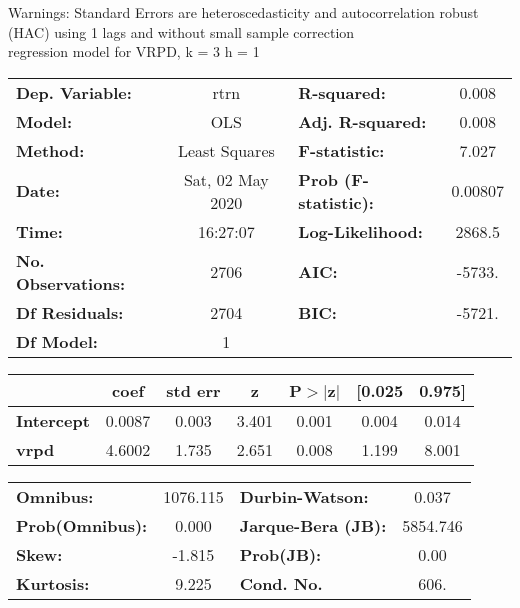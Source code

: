 Warnings: \newline
 [1] Standard Errors are heteroscedasticity and autocorrelation robust (HAC) using 1 lags and without small sample correction\\ 

regression model for VRPD, k = 3 h = 1\begin{center}
\begin{tabular}{lclc}
\toprule
\textbf{Dep. Variable:}    &       rtrn       & \textbf{  R-squared:         } &     0.008   \\
\textbf{Model:}            &       OLS        & \textbf{  Adj. R-squared:    } &     0.008   \\
\textbf{Method:}           &  Least Squares   & \textbf{  F-statistic:       } &     7.027   \\
\textbf{Date:}             & Sat, 02 May 2020 & \textbf{  Prob (F-statistic):} &  0.00807    \\
\textbf{Time:}             &     16:27:07     & \textbf{  Log-Likelihood:    } &    2868.5   \\
\textbf{No. Observations:} &        2706      & \textbf{  AIC:               } &    -5733.   \\
\textbf{Df Residuals:}     &        2704      & \textbf{  BIC:               } &    -5721.   \\
\textbf{Df Model:}         &           1      & \textbf{                     } &             \\
\bottomrule
\end{tabular}
\begin{tabular}{lcccccc}
                   & \textbf{coef} & \textbf{std err} & \textbf{z} & \textbf{P$> |$z$|$} & \textbf{[0.025} & \textbf{0.975]}  \\
\midrule
\textbf{Intercept} &       0.0087  &        0.003     &     3.401  &         0.001        &        0.004    &        0.014     \\
\textbf{vrpd}      &       4.6002  &        1.735     &     2.651  &         0.008        &        1.199    &        8.001     \\
\bottomrule
\end{tabular}
\begin{tabular}{lclc}
\textbf{Omnibus:}       & 1076.115 & \textbf{  Durbin-Watson:     } &    0.037  \\
\textbf{Prob(Omnibus):} &   0.000  & \textbf{  Jarque-Bera (JB):  } & 5854.746  \\
\textbf{Skew:}          &  -1.815  & \textbf{  Prob(JB):          } &     0.00  \\
\textbf{Kurtosis:}      &   9.225  & \textbf{  Cond. No.          } &     606.  \\
\bottomrule
\end{tabular}
\end{center}

